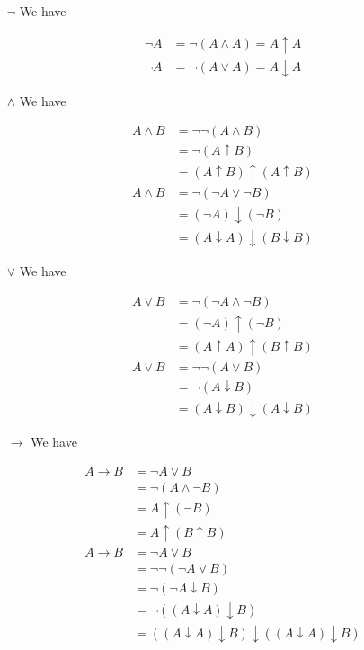 \documentclass{article}
\begin{document}
\begin{itemize}
    \item[$\lnot$] We have

    $$
        \begin{aligned}
            \lnot A&=\lnot(A\wedge A)=A\uparrow A\\
            \lnot A&=\lnot(A\vee A)=A\downarrow A
        \end{aligned}
    $$

    \item[$\wedge$] We have

    $$
        \begin{aligned}
            A\wedge B&=\lnot\lnot(A\wedge B)\\
            &=\lnot(A\uparrow B)\\
            &=(A\uparrow B)\uparrow(A\uparrow B)\\
            A\wedge B&=\lnot(\lnot A\vee\lnot B)\\
            &=(\lnot A)\downarrow(\lnot B)\\
            &=(A\downarrow A)\downarrow(B\downarrow B)
        \end{aligned}
    $$

    \item[$\vee$] We have

    $$
        \begin{aligned}
            A\vee B&=\lnot(\lnot A\wedge\lnot B)\\
            &=(\lnot A)\uparrow(\lnot B)\\
            &=(A\uparrow A)\uparrow(B\uparrow B)\\
            A\vee B&=\lnot\lnot(A\vee B)\\
            &=\lnot(A\downarrow B)\\
            &=(A\downarrow B)\downarrow(A\downarrow B)
        \end{aligned}
    $$

    \item[$\to$] We have

    $$
        \begin{aligned}
            A\to B&=\lnot A\vee B\\
            &=\lnot(A\wedge \lnot B)\\
            &=A\uparrow(\lnot B)\\
            &=A\uparrow(B\uparrow B)\\
            A\to B&=\lnot A\vee B\\
            &=\lnot\lnot(\lnot A\vee B)\\
            &=\lnot(\lnot A\downarrow B)\\
            &=\lnot((A\downarrow A)\downarrow B)\\
            &=((A\downarrow A)\downarrow B)\downarrow((A\downarrow A)\downarrow B)
        \end{aligned}
    $$
\end{itemize}
\end{document}
